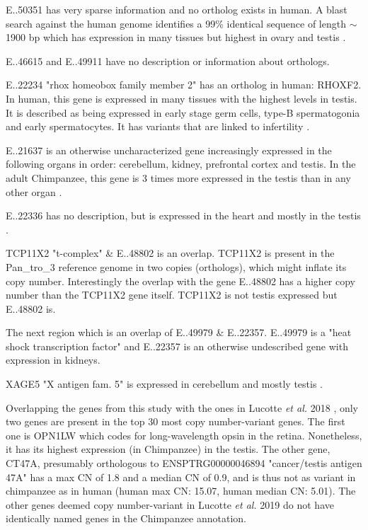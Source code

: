 E..50351 has very sparse information and no ortholog exists in human. A blast search against the human genome identifies a 99\% identical sequence of length $\sim$1900 bp which has expression in many tissues but highest in ovary and testis \cite{ensembl}. 

E..46615 and E..49911 have no description or information about orthologs.

E..22234 "rhox homeobox family member 2" has an ortholog in human: RHOXF2. In human, this gene is expressed in many tissues with the highest levels in testis. It is described as being expressed in early stage germ cells, type-B spermatogonia and early spermatocytes. It has variants that are linked to infertility \cite{10.1093/hmg/ddw313}.

E..21637 is an otherwise uncharacterized gene increasingly expressed in the following organs in order: cerebellum, kidney, prefrontal cortex and testis. In the adult Chimpanzee, this gene is 3 times more expressed in the testis than in any other organ \cite{bgee_}.

E..22336 has no description, but is expressed in the heart and mostly in the testis \cite{bgee_}.

TCP11X2 "t-complex" \& E..48802 is an overlap. TCP11X2 is present in the Pan\_tro\_3 reference genome in two copies (orthologs), which might inflate its copy number. Interestingly the overlap with the gene E..48802 has a higher copy number than the TCP11X2 gene itself. TCP11X2 is not testis expressed \cite{ensembl} but E..48802 is.

The next region which is an overlap of E..49979 \& E..22357. E..49979 is a "heat shock transcription factor" and E..22357 is an otherwise undescribed gene with expression in kidneys.

XAGE5 "X antigen fam. 5" is expressed in cerebellum and mostly testis \cite{bgee_}.

Overlapping the genes from this study with the ones in Lucotte \textit{et al.} 2018 \cite{Lucotte907}, only two genes are present in the top 30 most copy number-variant genes. The first one is OPN1LW which codes for long-wavelength opsin in the retina. Nonetheless, it has its highest expression (in Chimpanzee) in the testis\cite{bgee_}. The other gene, CT47A, presumably orthologous to ENSPTRG00000046894 "cancer/testis antigen 47A" has a max CN of 1.8 and a median CN of 0.9, and is thus not as variant in chimpanzee as in human (human max CN: 15.07, human median CN: 5.01). The other genes deemed copy number-variant in Lucotte \textit{et al.} 2019\cite{Lucotte907} do not have identically named genes in the Chimpanzee annotation.


